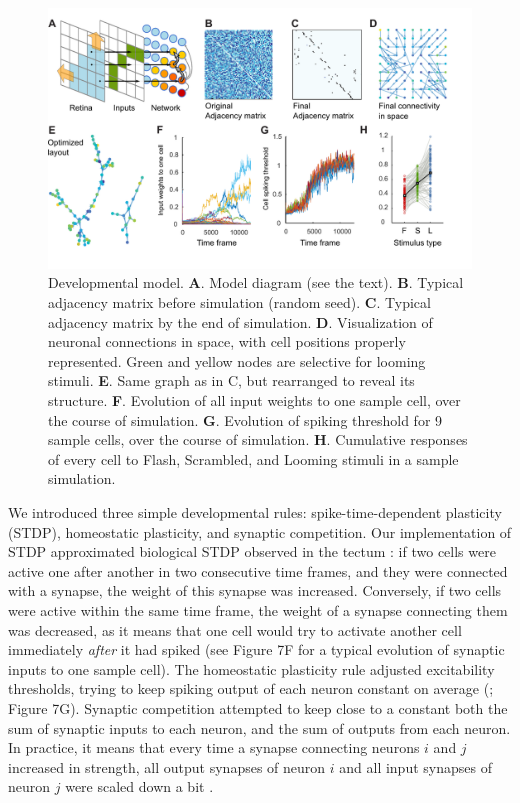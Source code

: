 \documentclass{article}
\begin{document}
\begin{figure}[!t]
\includegraphics[width=\linewidth]{fig7.pdf}
\caption{
Developmental model. \textbf{A}. Model diagram (see the text). \textbf{B}. Typical adjacency matrix before simulation (random seed). \textbf{C}. Typical adjacency matrix by the end of simulation. \textbf{D}. Visualization of neuronal connections in space, with cell positions properly represented. Green and yellow nodes are selective for looming stimuli. \textbf{E}. Same graph as in C, but rearranged to reveal its structure. \textbf{F}. Evolution of all input weights to one sample cell, over the course of simulation. \textbf{G}. Evolution of spiking threshold for 9 sample cells, over the course of simulation. \textbf{H}. Cumulative responses of every cell to Flash, Scrambled, and Looming stimuli in a sample simulation. }
\end{figure}

We introduced three simple developmental rules: spike-time-dependent plasticity (STDP), homeostatic plasticity, and synaptic competition. Our implementation of STDP approximated biological STDP observed in the tectum \citep{zhang1998stdp, mu2006stdp}: if two cells were active one after another in two consecutive time frames, and they were connected with a synapse, the weight of this synapse was increased. Conversely, if two cells were active within the same time frame, the weight of a synapse connecting them was decreased, as it means that one cell would try to activate another cell immediately \textit{after} it had spiked (see Figure 7F for a typical evolution of synaptic inputs to one sample cell). The homeostatic plasticity rule adjusted excitability thresholds, trying to keep spiking output of each neuron constant on average (\citealt{pratt2007intrinsic, turrigiano2011}; Figure 7G). Synaptic competition attempted to keep close to a constant both the sum of synaptic inputs to each neuron, and the sum of outputs from each neuron. In practice, it means that every time a synapse connecting neurons $i$ and $j$ increased in strength, all output synapses of neuron $i$ and all input synapses of neuron $j$ were scaled down a bit \citep{cohen2002synreview, munz2014hebbian, hamodi2016nmda}.
\end{document}
